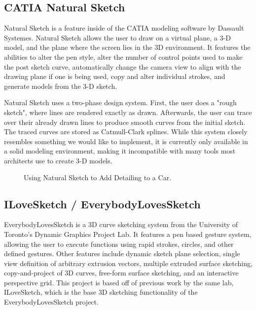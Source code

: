 \subsection{CATIA Natural Sketch}

Natural Sketch is a feature inside of the CATIA modeling software by Dassault Systemes. 
Natural Sketch allows the user to draw on a virtual plane, a 3-D model, and the plane where the screen lies in the 3D environment. 
It features the abilities to alter the pen style, alter the number of control points used to make the post sketch curve, automatically change the camera view to align with the drawing plane if one is being used, copy and alter individual strokes, and generate models from the 3-D sketch.

Natural Sketch uses a two-phase design system. First, the user does a "rough sketch", where lines are rendered exactly as drawn. 
Afterwards, the user can trace over their already drawn lines to produce smooth curves from the initial sketch.
The traced curves are stored as Catmull-Clark splines.
While this system closely resembles something we would like to implement, it is currently only available in a solid modeling environment, making it incompatible with many tools most architects use to create 3-D models.

\begin{figure}
\centering     %
{}
\caption{Using Natural Sketch to Add Detailing to a Car. \autocite{catiareel}}
\end{figure}

\subsection{ILoveSketch / EverybodyLovesSketch}

EverybodyLovesSketch is a 3D curve sketching system from the University of Toronto's Dynamic Graphics Project Lab. It features a pen based gesture system, allowing the user to execute functions using rapid strokes, circles, and other defined gestures. Other features include dynamic sketch plane selection, single view definition of arbitrary extrusion vectors, multiple extruded surface sketching, copy-and-project of 3D curves, free-form surface sketching, and an interactive perspective grid. This project is based off of previous work by the same lab, ILoveSketch, which is the base 3D sketching functionality of the EverybodyLovesSketch project.

